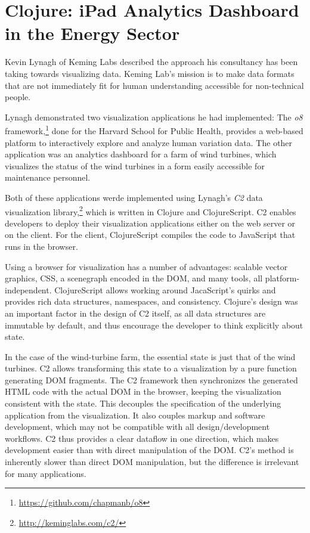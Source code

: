 \documentclass{jfp1}
\begin{document}
\section{Clojure: iPad Analytics Dashboard in the Energy Sector}

Kevin Lynagh of Keming Labs described the approach his consultancy has
been taking towards visualizing data.  Keming Lab's mission is to make
data formats that are not immediately fit for human
understanding accessible for non-technical people.  

Lynagh demonstrated two visualization applications he had implemented:
The \textit{o8}
framework,\footnote{\url{https://github.com/chapmanb/o8}} done for the
Harvard School for Public Health, provides a web-based platform to
interactively explore and analyze human variation data.  The other
application was an analytics dashboard for a farm of wind turbines,
which visualizes the status of the wind turbines in a form easily
accessible for maintenance personnel.

Both of these applications werde implemented using Lynagh's
\textit{C2} data visualization
library,\footnote{\url{http://keminglabs.com/c2/}} which is written in
Clojure and ClojureScript.  C2 enables developers to deploy their
visualization applications either on the web server or on the client.
For the client, ClojureScript compiles the code to JavaScript that
runs in the browser.

Using a browser for visualization has a number of advantages: 
scalable vector graphics, CSS, a scenegraph encoded in the
DOM, and many tools, all platform-independent.  ClojureScript allows
working around JacaScript's quirks and provides rich data structures,
namespaces, and consistency.  Clojure's design was an important factor
in the design of C2 itself, as all data structures are immutable by
default, and thus encourage the developer to think explicitly about
state.

In the case of the wind-turbine farm, the essential state is just
that of the wind turbines.  C2 allows transforming this state to a
visualization by a pure function generating DOM fragments.  The C2
framework then synchronizes the generated HTML code with the actual
DOM in the browser, keeping the visualization consistent with the
state.  This decouples the specification of the underlying application
from the visualization.  It also couples markup and software
development, which may not be compatible with all design/development
workflows.  C2 thus provides a clear dataflow in one direction, which
makes development easier than with direct manipulation of the DOM.
C2's method is inherently slower than direct DOM manipulation, but the
difference is irrelevant for many applications.
\end{document}
